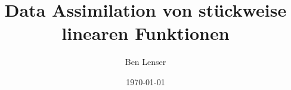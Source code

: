 \documentclass[
	12pt,
	a4paper,
	twoside,
	titlepage,
	parskip=half,
	BCOR=10mm,
	bibliography=totoc,
	headings=normal,
	DIV=calc,
 	draft
]{scrreprt}
\begin{document}
\author{Ben Lenser}
\title{Data Assimilation von stückweise linearen Funktionen}
\date{\today}

  

\cleardoublepage
{}










\begin{spacing}{1}
 \printbibliography
\end{spacing}

\appendix



\end{document}

